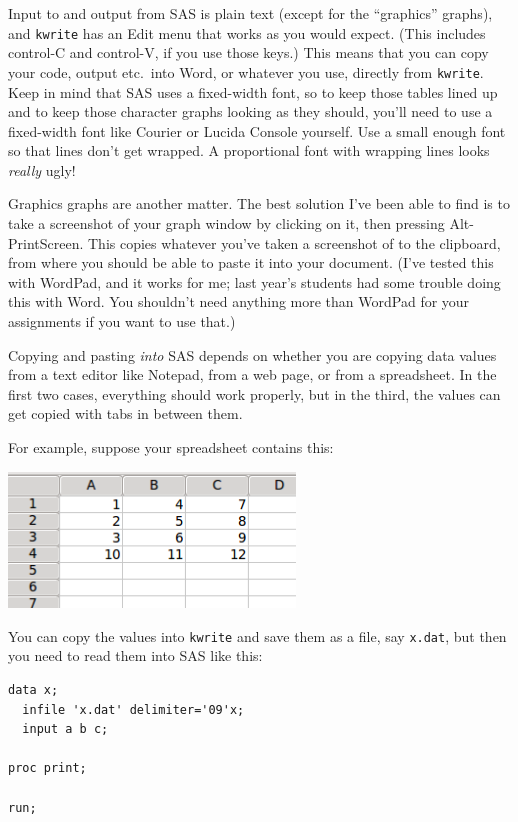 \documentclass[11pt]{article}
\begin{document}
Input to and output from SAS is plain text (except for the
``graphics'' graphs), and \texttt{kwrite} has an Edit menu that works
as you would expect. (This includes control-C and control-V, if you
use those keys.) This means that you can copy your code, output etc.\
into Word, or whatever you use, directly from \texttt{kwrite}. Keep in
mind that SAS uses a fixed-width font, so to keep those tables lined
up and to keep those character graphs looking as they should, you'll
need to use a fixed-width font like Courier or Lucida Console
yourself. Use a small enough font so that lines don't get wrapped. A
proportional font with wrapping lines looks \emph{really} ugly!

Graphics graphs are another matter. The best solution I've been able
to find is to take a screenshot of your graph window by clicking on
it, then pressing Alt-PrintScreen. This copies whatever you've taken a
screenshot of to the clipboard, from where you should be able to paste
it into your document. (I've tested this with WordPad, and it works
for me; last year's students had some trouble doing this with
Word. You shouldn't need anything more than WordPad for your
assignments if you want to use that.)

Copying and pasting \emph{into} SAS depends on whether you are copying
data values from a text editor like Notepad, from a web page, or from
a spreadsheet. In the first two cases, everything should work
properly, but in the third, the values can get copied with tabs in
between them.

For example, suppose your spreadsheet contains this:

\includegraphics[width=3in]{s-data}

You can copy the values into \texttt{kwrite} and save them as a file, say
\verb-x.dat-, but then you need to read them into SAS like this:

\filbreak
\begin{verbatim}
data x;
  infile 'x.dat' delimiter='09'x;
  input a b c;

proc print;

run;
\end{verbatim}
\filbreak
\end{document}
